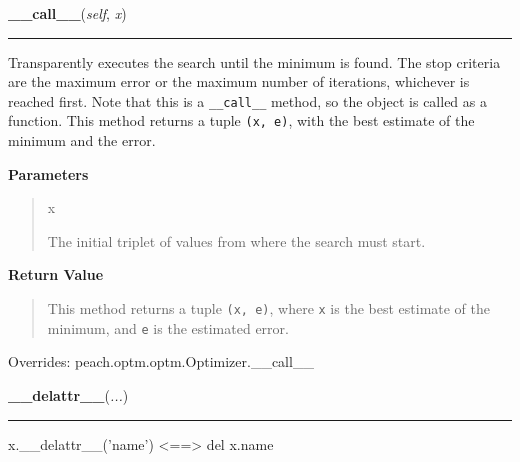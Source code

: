     \begin{boxedminipage}{\textwidth}

    \raggedright \textbf{\_\_call\_\_}(\textit{self}, \textit{x})

    \vspace{-1.5ex}

    \rule{\textwidth}{0.5\fboxrule}

Transparently executes the search until the minimum is found. The stop
criteria are the maximum error or the maximum number of iterations,
whichever is reached first. Note that this is a \texttt{{\_}{\_}call{\_}{\_}} method, so
the object is called as a function. This method returns a tuple
\texttt{(x, e)}, with the best estimate of the minimum and the error.
    \vspace{1ex}

      \textbf{Parameters}
      \begin{quote}
        \begin{Ventry}{x}

          \item[x]


The initial triplet of values from where the search must start.
        \end{Ventry}

      \end{quote}

    \vspace{1ex}

      \textbf{Return Value}
      \begin{quote}

This method returns a tuple \texttt{(x, e)}, where \texttt{x} is the best
estimate of the minimum, and \texttt{e} is the estimated error.
      \end{quote}

    \vspace{1ex}

      Overrides: peach.optm.optm.Optimizer.\_\_call\_\_

    \end{boxedminipage}

    \label{object:__delattr__}

    \vspace{0.5ex}

    \begin{boxedminipage}{\textwidth}

    \raggedright \textbf{\_\_delattr\_\_}(\textit{...})

    \vspace{-1.5ex}

    \rule{\textwidth}{0.5\fboxrule}

x.{\_}{\_}delattr{\_}{\_}('name') {\textless}=={\textgreater} del x.name
    \vspace{1ex}

    \end{boxedminipage}

